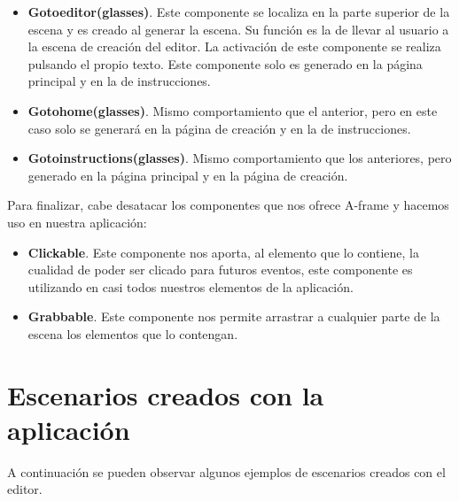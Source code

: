 \documentclass[a4paper, 12pt]{book}
\begin{document}
\begin{itemize}
    \item \textbf{Gotoeditor(glasses)}. Este componente se localiza en la parte superior de la escena y es creado al generar la escena. Su función es la de llevar al usuario a la escena de creación del editor. La activación de este componente se realiza pulsando el propio texto. Este componente solo es generado en la página principal y en la de instrucciones.
    
    \item \textbf{Gotohome(glasses)}. Mismo comportamiento que el anterior, pero en este caso solo se generará en la página de creación y en la de instrucciones.
    
    \item \textbf{Gotoinstructions(glasses)}. Mismo comportamiento que los anteriores, pero generado en la página principal y en la página de creación.
\end{itemize}

Para finalizar, cabe desatacar los componentes que nos ofrece A-frame y hacemos uso en nuestra aplicación:
\begin{itemize}
    \item \textbf{Clickable}. Este componente nos aporta, al elemento que lo contiene, la cualidad de poder ser clicado para futuros eventos, este componente es utilizando en casi todos nuestros elementos de la aplicación.
    \item \textbf{Grabbable}. Este componente nos permite arrastrar a cualquier parte de la escena los elementos que lo contengan. 
\end{itemize}

\section{Escenarios creados con la aplicación}
A continuación se pueden observar algunos ejemplos de escenarios creados con el editor.
\end{document}
